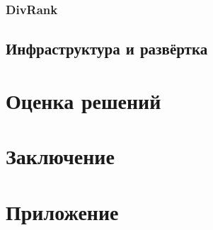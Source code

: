 \documentclass[a4paper, 14pt]{extarticle}
\begin{document}
\subsubsection{DivRank}

\subsection{Инфраструктура и развёртка}

\section{Оценка решений}
\section{Заключение}



\section*{Приложение}
\end{document}
